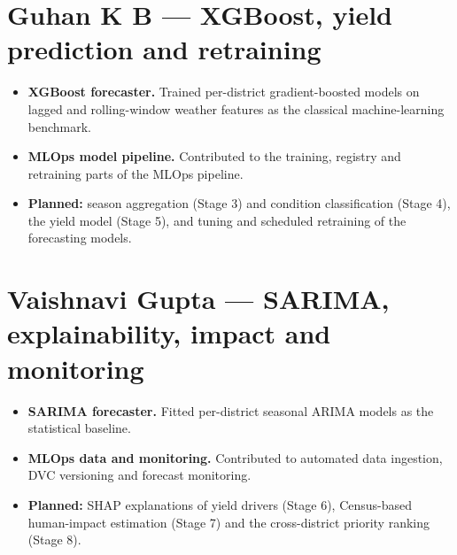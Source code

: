 \section{Guhan K B --- XGBoost, yield prediction and retraining}
\begin{itemize}
	\item \textbf{XGBoost forecaster.} Trained per-district gradient-boosted models on lagged and rolling-window weather features as the classical machine-learning benchmark.
	\item \textbf{MLOps model pipeline.} Contributed to the training, registry and retraining parts of the MLOps pipeline.
	\item \textbf{Planned:} season aggregation (Stage 3) and condition classification (Stage 4), the yield model (Stage 5), and tuning and scheduled retraining of the forecasting models.
\end{itemize}

\section{Vaishnavi Gupta --- SARIMA, explainability, impact and monitoring}
\begin{itemize}
	\item \textbf{SARIMA forecaster.} Fitted per-district seasonal ARIMA models as the statistical baseline.
	\item \textbf{MLOps data and monitoring.} Contributed to automated data ingestion, DVC versioning and forecast monitoring.
	\item \textbf{Planned:} SHAP explanations of yield drivers (Stage 6), Census-based human-impact estimation (Stage 7) and the cross-district priority ranking (Stage 8).
\end{itemize}
